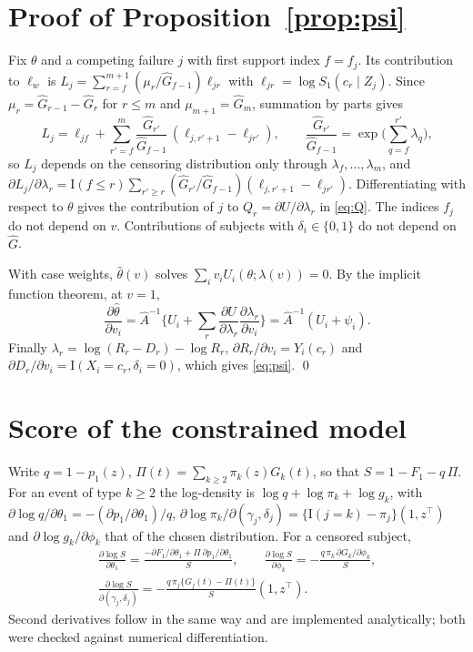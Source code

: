 \documentclass[11pt]{article}
\newcommand{\I}{\mathrm{I}}
\newcommand{\T}{\top}
\newcommand{\Ghat}{\widehat G}
\begin{document}
\section{Proof of Proposition~\ref{prop:psi}}\label{app:psi}
Fix $\theta$ and a competing failure $j$ with first support index $f = f_j$. Its contribution to
$\ell_w$ is $L_j = \sum_{r = f}^{m+1} (\mu_r/\Ghat_{f-1}) \ell_{jr}$ with
$\ell_{jr} = \log S_1(c_r \mid Z_j)$. Since $\mu_r = \Ghat_{r-1} - \Ghat_r$ for $r \le m$ and
$\mu_{m+1} = \Ghat_m$, summation by parts gives
\[
L_j = \ell_{jf} + \sum_{r' = f}^{m} \frac{\Ghat_{r'}}{\Ghat_{f-1}}\,(\ell_{j,r'+1} - \ell_{jr'}),
\qquad \frac{\Ghat_{r'}}{\Ghat_{f-1}} = \exp\Big(\sum_{q=f}^{r'} \lambda_q\Big),
\]
so $L_j$ depends on the censoring distribution only through $\lambda_f, \dots, \lambda_m$, and
$\partial L_j / \partial\lambda_r = \I(f \le r) \sum_{r' \ge r} (\Ghat_{r'}/\Ghat_{f-1})(\ell_{j,r'+1} - \ell_{jr'})$.
Differentiating with respect to $\theta$ gives the contribution of $j$ to $Q_r = \partial U/\partial\lambda_r$
in \eqref{eq:Q}. The indices $f_j$ do not depend on $v$. Contributions of subjects with
$\delta_i \in \{0, 1\}$ do not depend on $\Ghat$.

With case weights, $\hat\theta(v)$ solves $\sum_i v_i U_i(\theta; \lambda(v)) = 0$. By the implicit
function theorem, at $v = 1$,
\[
\frac{\partial\hat\theta}{\partial v_i} = \hat A^{-1}\Big\{U_i + \sum_r \frac{\partial U}{\partial \lambda_r}\frac{\partial \lambda_r}{\partial v_i}\Big\}
= \hat A^{-1}(U_i + \psi_i).
\]
Finally $\lambda_r = \log(R_r - D_r) - \log R_r$, $\partial R_r/\partial v_i = Y_i(c_r)$ and
$\partial D_r/\partial v_i = \I(X_i = c_r, \delta_i = 0)$, which gives \eqref{eq:psi}. \qed

\section{Score of the constrained model}\label{app:score}
Write $q = 1 - p_1(z)$, $\Pi(t) = \sum_{k \ge 2} \pi_k(z) G_k(t)$, so that $S = 1 - F_1 - q\,\Pi$.
For an event of type $k \ge 2$ the log-density is $\log q + \log\pi_k + \log g_k$, with
$\partial \log q/\partial\theta_1 = -(\partial p_1/\partial\theta_1)/q$,
$\partial \log \pi_k / \partial(\gamma_j, \delta_j) = \{\I(j = k) - \pi_j\}(1, z^\T)$ and
$\partial \log g_k/\partial \phi_k$ that of the chosen distribution. For a censored subject,
\begin{gather*}
\frac{\partial \log S}{\partial \theta_1} = \frac{-\partial F_1/\partial\theta_1 + \Pi\,\partial p_1/\partial\theta_1}{S},\qquad
\frac{\partial \log S}{\partial \phi_k} = -\frac{q\,\pi_k\,\partial G_k/\partial\phi_k}{S},\\
\frac{\partial \log S}{\partial (\gamma_j, \delta_j)} = -\frac{q\,\pi_j\{G_j(t) - \Pi(t)\}}{S}(1, z^\T).
\end{gather*}
Second derivatives follow in the same way and are implemented analytically; both were checked
against numerical differentiation.
\end{document}
